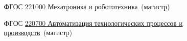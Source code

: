 \begin{thebibliography}{99}

 ФГОС
\href{http://www.edu.ru/db-mon/mo/Data/d\_09/prm702-1.pdf}{221000 Мехатроника и
робототехника}\ (магистр)

 ФГОС
\href{http://www.edu.ru/db-mon/mo/Data/d\_09/prm763-1.pdf}{220700 Автоматизация
технологических процессов и производств}\ (магистр)

\end{thebibliography}